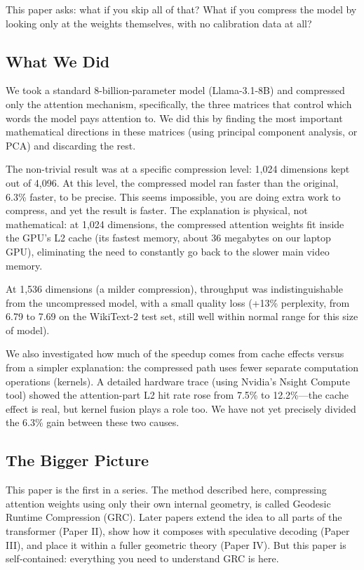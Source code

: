 \documentclass[11pt]{article}
\begin{document}
This paper asks: what if you skip all of that? What if you compress the model
by looking only at the weights themselves, with no calibration data at all?

\subsection{What We Did}

We took a standard 8-billion-parameter model (Llama-3.1-8B) and compressed
only the attention mechanism, specifically, the three matrices that control
which words the model pays attention to. We did this by finding the most
important mathematical directions in these matrices (using principal component
analysis, or PCA) and discarding the rest.

The non-trivial result was at a specific compression level: 1,024 dimensions kept out
of 4,096. At this level, the compressed model ran faster than the
original, 6.3\% faster, to be precise. This seems impossible, you are doing
extra work to compress, and yet the result is faster. The explanation is
physical, not mathematical: at 1,024 dimensions, the compressed attention
weights fit inside the GPU's L2 cache (its fastest memory, about 36 megabytes
on our laptop GPU), eliminating the need to constantly go back to the slower
main video memory.

At 1,536 dimensions (a milder compression), throughput was indistinguishable
from the uncompressed model, with a small quality loss (+13\% perplexity, from
6.79 to 7.69 on the WikiText-2 test set, still well within normal range for
this size of model).

We also investigated how much of the speedup comes from cache effects versus
from a simpler explanation: the compressed path uses fewer separate computation
operations (kernels). A detailed hardware trace (using Nvidia's Nsight Compute
tool) showed the attention-part L2 hit rate rose from 7.5\% to 12.2\%---the
cache effect is real, but kernel fusion plays a role too. We have not yet
precisely divided the 6.3\% gain between these two causes.

\subsection{The Bigger Picture}

This paper is the first in a series. The method described here, compressing
attention weights using only their own internal geometry, is called Geodesic
Runtime Compression (GRC). Later papers extend the idea to all parts of the
transformer (Paper II), show how it composes with speculative decoding
(Paper III), and place it within a fuller geometric theory (Paper IV). But
this paper is self-contained: everything you need to understand GRC is here.
\end{document}
